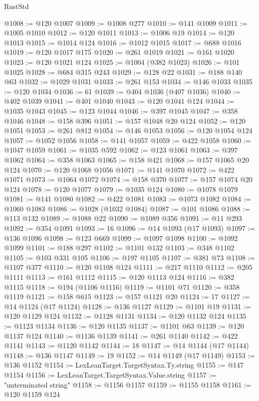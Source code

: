 \begin{lexlean}{RustStd}
\begin{coremodule}
@1008 := @120 @1007
@1009 := @1008 @277
@1010 := @141 @1009
@1011 := @1005 @1010
@1012 := @120 @1011
@1013 := @1006 @19
@1014 := @120 @1013
@1015 := @1014 @124
@1016 := @1012 @1015
@1017 := @688 @1016
@1019 := @120 @1017 @175
@1020 := @261 @1019
@1021 := @161 @1020
@1023 := @120 @1021 @124
@1025 := @1004 (@382 @1023)
@1026 := @101 @1025
@1028 := @684 @315 @243
@1029 := @128 @22
@1031 := @188 @140 @63
@1032 := @1029 @1031
@1033 := @261 @153
@1034 := @146 @1033
@1035 := @120 @1034
@1036 := 61
@1039 := @404 @1036 (@407 @1036)
@1040 := @402 @1039
@1041 := @401 @1040
@1043 := @120 @1041 @124
@1044 := @1035 @1043
@1045 := @123 @1044
@1046 := @397 @1045
@1047 := @358 @1046
@1048 := @158 @396
@1051 := @157 @1048 @20 @124
@1052 := @120 @1051
@1053 := @261 @812
@1054 := @146 @1053
@1056 := @120 @1054 @124
@1057 := @1052 @1056
@1058 := @141 @1057
@1059 := @422 @1058
@1060 := @1047 @1059
@1061 := @1035 @592
@1062 := @123 @1061
@1063 := @397 @1062
@1064 := @358 @1063
@1065 := @158 @421
@1068 := @157 @1065 @20 @124
@1070 := @120 @1068 @1056
@1071 := @141 @1070
@1072 := @422 @1071
@1073 := @1064 @1072
@1074 := @158 @370
@1077 := @157 @1074 @20 @124
@1078 := @120 @1077
@1079 := @1035 @124
@1080 := @1078 @1079
@1081 := @141 @1080
@1082 := @422 @1081
@1083 := @1073 @1082
@1084 := @1060 @1083
@1086 := @1028 (@1032 @1084)
@1087 := @101 @1086
@1088 := @113 @132
@1089 := @1088 @22
@1090 := @1089 @356
@1091 := @11 @293
@1092 := @354 @1091
@1093 := 16
@1096 := @14 @1093 (@17 @1093)
@1097 := @136 @1096
@1098 := @123 @669
@1099 := @1097 @1098
@1100 := @1092 @1099
@1101 := @188 @297
@1102 := @1101 @132
@1103 := @348 @1102
@1105 := @103 @331 @105
@1106 := @197 @1105
@1107 := @381 @73
@1108 := @1107 @377
@1110 := @120 @1108 @124
@1111 := @217 @1110
@1112 := @205 @1111
@1113 := @161 @1112
@1115 := @120 @1113 @124
@1116 := @382 @1115
@1118 := @194 (@1106 @1116)
@1119 := @1101 @71
@1120 := @358 @1119
@1121 := @158 @615
@1123 := @157 @1121 @20
@1124 := 17
@1127 := @14 @1124 (@17 @1124)
@1128 := @136 @1127
@1129 := @1101 @19
@1131 := @120 @1129 @124
@1132 := @1128 @1131
@1134 := @120 @1132 @124
@1135 := @1123 @1134
@1136 := @120 @1135
@1137 := @1101 @63
@1139 := @120 @1137 @124
@1140 := @1136 @1139
@1141 := @261 @1140
@1142 := @422 @1141
@1143 := @1120 @1142
@1144 := 18
@1147 := @14 @1144 (@17 @1144)
@1148 := @136 @1147
@1149 := 19
@1152 := @14 @1149 (@17 @1149)
@1153 := @136 @1152
@1154 := LexLeanTarget.TargetSyntax.Ty.string
@1155 := @147 @1154
@1156 := LexLeanTarget.TargetSyntax.Value.string
@1157 := "unterminated string"
@1158 := @1156 @1157
@1159 := @1155 @1158
@1161 := @120 @1159 @124

\end{coremodule}
\end{lexlean}
